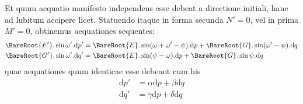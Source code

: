 Et quum aequatio manifesto independens esse debeat a directione initiali, hanc ad lubitum accipere licet. Statuendo itaque in forma secunda \(N'=0\), vel in prima \(M'=0\), obtinemus aequationes sequentes:
\[
\begin{aligned}
\BareRoot{E'}\mathord{.}\sin\omega'\mathord{.}\mathrm{d}p'&=\BareRoot{E}\mathord{.}\sin(\omega+\omega'-\psi)\mathord{.}\mathrm{d}p+\BareRoot{G}\mathord{.}\sin(\omega'-\psi)\mathord{.}\mathrm{d}q\\
\BareRoot{G'}\mathord{.}\sin\omega'\mathord{.}\mathrm{d}q'&=\BareRoot{E}\mathord{.}\sin(\psi-\omega)\mathord{.}\mathrm{d}p+\BareRoot{G}\mathord{.}\sin\psi\mathord{.}\mathrm{d}q
\end{aligned}
\]
quae aequationes quum identicae esse debeant cum his
\[
\begin{aligned}
\mathrm{d}p'&=\alpha\mathrm{d}p+\beta\mathrm{d}q\\
\mathrm{d}q'&=\gamma\mathrm{d}p+\delta\mathrm{d}q
\end{aligned}
\]
